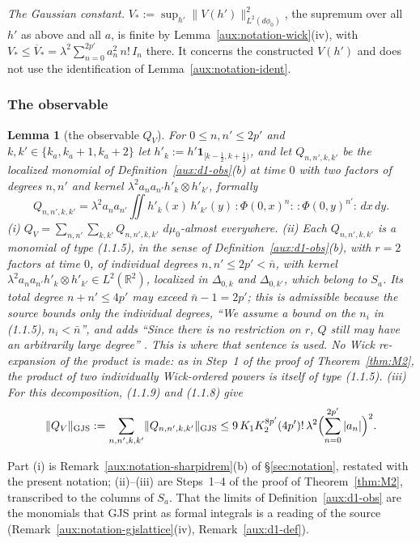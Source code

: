 \documentclass[11pt,a4paper]{article}
\theoremstyle{plain}
\theoremstyle{definition}
\theoremstyle{plain}
\newtheorem{auxlemma}{Lemma}
\theoremstyle{definition}
\newcommand{\R}{\mathbb{R}}
\newcommand{\GJS}[1]{\lVert #1\rVert_{\mathrm{GJS}}}   %
\newcommand{\dmu}{d\mu_0}
\newcommand{\dphi}{d\phi_0}
\begin{document}
\emph{The Gaussian constant.}  $V_*:=\sup_{h'}\|V(h')\|_{L^2(\dphi)}^2$, the supremum over all $h'$
as above and all $a$, is finite by Lemma~\ref{aux:notation-wick}(iv), with
$V_*\le\overline V_*=\lambda^2\sum_{n=0}^{2p'}a_n^2\,n!\,I_n$ there.  It concerns the
constructed $V(h')$ and does not use the identification of Lemma~\ref{aux:notation-ident}.

\subsubsection{The observable}\label{sub:d4-aux}

\begin{auxlemma}[the observable $Q_V$]\label{aux:d4-QV}
For $0\le n,n'\le2p'$ and $k,k'\in\{k_a,k_a+1,k_a+2\}$ let
$h'_k:=h'\mathbf 1_{[k-\frac12,k+\frac12)}$, and let $Q_{n,n',k,k'}$ be the localized monomial of
Definition~\ref{aux:d1-obs}(b) at time $0$ with two factors of degrees $n,n'$ and kernel
$\lambda^2a_na_{n'}h'_k\otimes h'_{k'}$, formally
\[
 Q_{n,n',k,k'}=\lambda^2a_na_{n'}\iint h'_k(x)\,h'_{k'}(y)\,{:}\Phi(0,x)^n{:}\,{:}\Phi(0,y)^{n'}{:}
 \,dx\,dy .
\]
\emph{(i)} $Q_V=\sum_{n,n'}\sum_{k,k'}Q_{n,n',k,k'}$ $\dmu$-almost everywhere.
\emph{(ii)} Each $Q_{n,n',k,k'}$ is a monomial of type (1.1.5), in the sense of
Definition~\ref{aux:d1-obs}(b), with $r=2$ factors at time $0$, of individual degrees
$n,n'\le2p'<\bar n$, with kernel $\lambda^2a_na_{n'}h'_k\otimes h'_{k'}\in L^2(\R^2)$, localized
in $\Delta_{0,k}$ and $\Delta_{0,k'}$, which belong to $S_a$.  Its total degree $n+n'\le4p'$ may
exceed $\bar n-1=2p'$; this is admissible because the source bounds only the individual degrees,
``We assume a bound on the $n_i$ in (1.1.5), $n_i<\bar n$'', and adds ``Since there is no
restriction on $r$, $Q$ still may have an arbitrarily large degree'' \cite[p.~593]{GJS}.  This is
where that sentence is used.  No Wick re-expansion of the product is made: as in Step~1 of the
proof of Theorem~\ref{thm:M2}, the product of two individually
Wick-ordered powers is itself of type (1.1.5).
\emph{(iii)} For this decomposition, (1.1.9) and (1.1.8) give
\[
 \GJS{Q_V}:=\sum_{n,n',k,k'}\GJS{Q_{n,n',k,k'}}
 \le9\,K_1K_2^{8p'}(4p')!\,\lambda^2\Bigl(\sum_{n=0}^{2p'}|a_n|\Bigr)^2 .
\]
\end{auxlemma}

Part (i) is Remark~\ref{aux:notation-sharpidrem}(b) of \S\ref{sec:notation}, restated with the
present notation; (ii)--(iii) are Steps~1--4 of the proof of Theorem~\ref{thm:M2},
transcribed to the columns of $S_a$.  That the limits of Definition~\ref{aux:d1-obs} are the
monomials that GJS print as formal integrals is a reading of the source
(Remark~\ref{aux:notation-gjslattice}(iv), Remark~\ref{aux:d1-def}).
\end{document}
